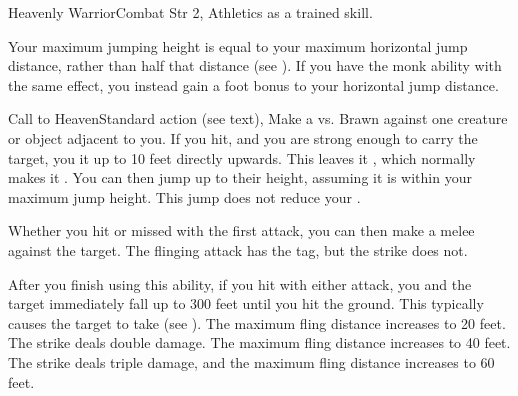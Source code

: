   \begin{feat}{Heavenly Warrior}{Combat}
    \featpre Str 2, Athletics as a trained skill.

     Your maximum jumping height is equal to your maximum horizontal jump distance, rather than half that distance (see ).
    If you have the  monk ability with the same effect, you instead gain a  foot bonus to your horizontal jump distance.

    \begin{activeability}{Call to Heaven}{Standard action}
      \abilitytags \atBrawling (see text), \atPhysical
      \rankline
      Make a  vs. Brawn against one creature or object adjacent to you.
      If you hit, and you are strong enough to carry the target, you  it up to 10 feet directly upwards.
      This leaves it , which normally makes it \unsteady.
      You can then jump up to their height, assuming it is within your maximum jump height.
      This jump does not reduce your .

      Whether you hit or missed with the first attack, you can then make a melee  against the target.
      The flinging attack has the \atBrawling tag, but the strike does not.

      After you finish using this ability, if you hit with either attack, you and the target immediately fall up to 300 feet until you hit the ground.
      This typically causes the target to take  (see ).
      \rankline
       The maximum fling distance increases to 20 feet.
       The strike deals double damage.
       The maximum fling distance increases to 40 feet.
       The strike deals triple damage, and the maximum fling distance increases to 60 feet.
    \end{activeability}


\end{feat}
